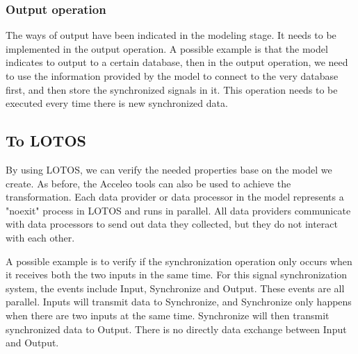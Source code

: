 \documentclass[11pt, oneside]{article}   	%
\begin{document}
\subsubsection{Output operation}
\indent \par The ways of output have been indicated in the modeling stage. It needs to be implemented in the output operation. A possible example is that the model indicates to output to a certain database, then in the output operation, we need to use the information provided by the model to connect to the very database first, and then store the synchronized signals in it. This operation needs to be executed every time there is new synchronized data. 


\subsection{To LOTOS}
\indent \par  By using LOTOS\cite{ref19}, we can verify the needed properties base on the model we create. As before, the Acceleo tools can also be used to achieve the transformation. Each data provider or data processor in the model represents a "noexit" process in LOTOS and runs in parallel. All data providers communicate with data processors to send out data they collected, but they do not interact with each other. \\
\indent \par A possible example is to verify if the synchronization operation only occurs when it receives both the two inputs in the same time. For this signal synchronization system, the events include Input, Synchronize and Output. These events are all parallel. Inputs will transmit data to Synchronize, and Synchronize only happens when there are two inputs at the same time. Synchronize will then transmit synchronized data to Output. There is no directly data exchange between Input and Output. 
\end{document}
